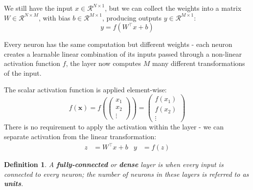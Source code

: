\documentclass[11pt]{article}
\newtheorem{defn}{Definition}
\begin{document}
We still have the input $x \in \mathcal{R}^{N \times 1}$, but we can collect the weights into a matrix $W \in \mathcal{R}^{N \times M}$, with bias $b \in \mathcal{R}^{M \times 1}$, producing outputs $y \in \mathcal{R}^{M \times 1}$:
\[
  y = f(W^\intercal x + b) 
\]

Every neuron has the same computation but different weights - each neuron creates a learnable linear combination of its inputs passed through a non-linear activation function $f$, the layer now computes $M$ many different transformations of the input.

The scalar activation function is applied element-wise:
\[
  f(\textbf{x}) = 
  f 
  \left( 
    \begin{pmatrix}
      x_1 \\ x_2 \\ \vdots
    \end{pmatrix}
  \right) 
  =
  \begin{pmatrix}
    f(x_1) \\ f(x_2) \\ \vdots
  \end{pmatrix}
\]
There is no requirement to apply the activation within the layer - we can separate activation from the linear transformation:
\begin{align*}
  z &= W^\intercal x + b &
  y &= f(z)
\end{align*}

\begin{defn}
  A \textbf{fully-connected} or \textbf{dense} layer is when every input is connected to every neuron; the number of neurons in these layers is referred to as \textbf{units}.
\end{defn}
\end{document}
